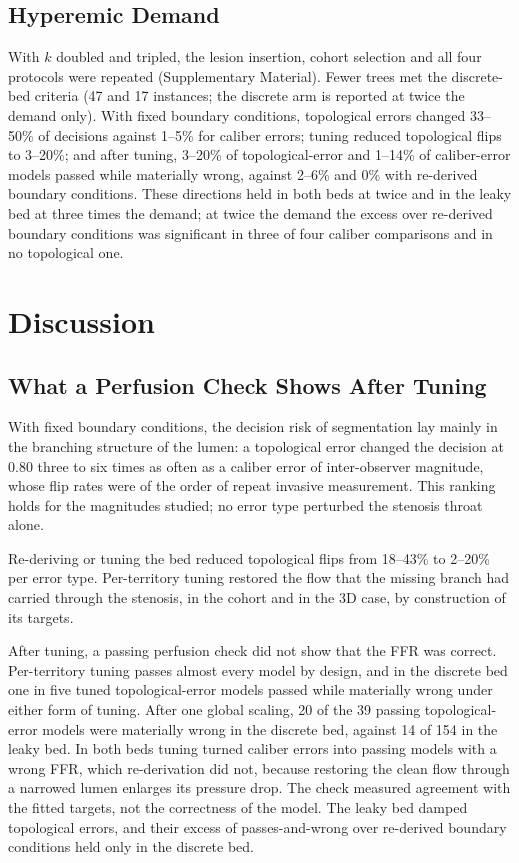 \documentclass[journal,twoside,web]{ieeecolor}
\begin{document}
\subsection{Hyperemic Demand}\label{sec:demand}
With $k$ doubled and tripled, the lesion insertion, cohort selection and all four protocols were repeated (Supplementary
Material). Fewer trees met the discrete-bed
criteria (47 and 17 instances; the discrete arm is reported at twice the demand only).
With fixed boundary conditions, topological errors changed 33--50\% of decisions against 1--5\% for caliber errors;
tuning reduced topological flips to 3--20\%; and after tuning, 3--20\% of topological-error and 1--14\% of
caliber-error models passed while materially wrong, against 2--6\% and 0\% with re-derived boundary conditions. These
directions held in both beds at twice and in the leaky bed at three times the demand; at twice the demand the
excess over re-derived boundary conditions was significant in three of four caliber comparisons and in no
topological one.

\section{Discussion}
\subsection{What a Perfusion Check Shows After Tuning}
With fixed boundary conditions, the decision risk of segmentation lay mainly in the branching
structure of the lumen: a topological error changed the decision at 0.80 three to six times as often as a caliber
error of inter-observer magnitude, whose flip rates were of the order of repeat invasive measurement. This ranking
holds for the magnitudes studied; no error type perturbed the stenosis throat alone.

Re-deriving or tuning the bed reduced topological flips from 18--43\% to 2--20\% per error type. Per-territory
tuning restored the flow that the missing branch had carried through the stenosis, in the cohort and in the 3D case, by construction of its targets.

After tuning, a passing perfusion check did not show that the FFR was correct. Per-territory tuning passes
almost every model by design, and in the discrete bed one in five tuned topological-error models passed while
materially wrong under either form of tuning. After one global scaling, 20 of the 39 passing topological-error models were materially wrong in the discrete bed, against 14 of 154 in the leaky bed. In both beds tuning turned
caliber errors into passing models with a wrong FFR, which re-derivation did not, because restoring the clean flow through a narrowed lumen enlarges
its pressure drop. The check measured agreement with the fitted targets, not the correctness of the model. The leaky
bed damped topological errors, and their excess of passes-and-wrong over re-derived boundary conditions held only in
the discrete bed.
\end{document}
